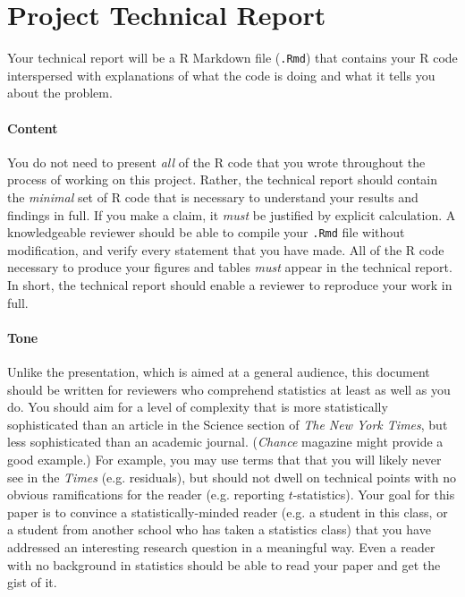 \documentclass[10pt]{article}
\begin{document}
\section*{Project Technical Report}

Your technical report will be a R Markdown file (\texttt{.Rmd}) that contains your R code interspersed with explanations of what the code is doing and what it tells you about the problem.  
	
\paragraph{Content}
You do not need to present \emph{all} of the R code that you wrote throughout the process of working on this project. Rather, the technical report should contain the \emph{minimal} set of R code that is necessary to understand your results and findings in full. If you make a claim, it \emph{must} be justified by explicit calculation. A knowledgeable reviewer should be able to compile your \texttt{.Rmd} file without modification, and verify every statement that you have made. All of the R code necessary to produce your figures and tables \emph{must} appear in the technical report. In short, the technical report should enable a reviewer to reproduce your work in full.
	
\paragraph{Tone} Unlike the presentation, which is aimed at a general audience, this document should be written for reviewers who comprehend statistics at least as well as you do. You should aim for a level of complexity that is more statistically sophisticated than an article in the Science section of \textit{The New York Times}, but less sophisticated than an academic journal. (\textit{Chance} magazine might provide a good example.) For example, you may use terms that that you will likely never see in the \textit{Times} (e.g. residuals), but should not dwell on technical points with no obvious ramifications for the reader (e.g. reporting $t$-statistics). Your goal for this paper is to convince a statistically-minded reader (e.g. a student in this class, or a student from another school who has taken a statistics class) that you have addressed an interesting research question in a meaningful way. Even a reader with no background in statistics should be able to read your paper and get the gist of it.  
\end{document}

